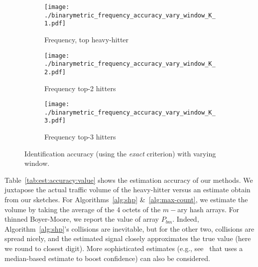\documentclass[10pt, conference, letterpaper,onecolumn]{IEEEtranv1.8}
\theoremstyle{plain}\newtheorem{thm}{Theorem}\newtheorem{lem}{Lemma}
\theoremstyle{definition}
\begin{document}
\begin{figure*}
        \vspace{-12pt}
        \centering
        \begin{subfigure}[b]{0.3\textwidth}
                \texttt{[image: ./binarymetric\_frequency\_accuracy\_vary\_window\_K\_1.pdf]}
                \caption{\footnotesize Frequency, top heavy-hitter}
                \label{fig:win:1}
        \end{subfigure}
        \begin{subfigure}[b]{0.3\textwidth}
                \texttt{[image: ./binarymetric\_frequency\_accuracy\_vary\_window\_K\_2.pdf]}
                \caption{\footnotesize Frequency top-2 hitters}
                \label{fig:win:2}
        \end{subfigure}       
        \begin{subfigure}[b]{0.3\textwidth}
                \texttt{[image: ./binarymetric\_frequency\_accuracy\_vary\_window\_K\_3.pdf]}
                \caption{\footnotesize Frequency top-3 hitters}
                \label{fig:win:3}
        \end{subfigure}
        \caption{\footnotesize Identification accuracy (using the \emph{exact} criterion)  with varying window.}
        \label{fig:window_size_vary}
\end{figure*}

Table~\ref{tab:est:accuracy:value} shows the estimation accuracy of our methods. 
We juxtapose the actual traffic volume of the heavy-hitter versus an estimate obtain from our sketches.
For Algorithms~\ref{alg:shp} \&~\ref{alg:max-count},   we estimate 
the volume by taking the average of the 4 octets
of the $m-$ary hash arrays. For thinned Boyer-Moore,
we report the value of array $P_{bm}$. Indeed,  Algorithm~\ref{alg:shp}'s 
collisions are inevitable, but for the other two, collisions are spread nicely, and
the estimated signal closely approximates  the true value (here we round to closest digit). More sophisticated estimates  (e.g., see~\cite{Krishnamurthy:2003:SCD:948205.948236} that uses a median-based estimate
to boost confidence) can also be considered.
\end{document}
